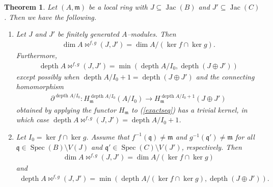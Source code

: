 \documentclass[10pt,a4paper]{amsart}
\newtheorem{theorem}{Theorem}
\DeclareMathOperator{\depth}{depth}
\DeclareMathOperator{\jac}{Jac}
\DeclareMathOperator{\spec}{Spec}
\begin{document}
\begin{theorem}\label{dimdepthcalclemma}
    Let $(A,\mathfrak{m})$ be a local ring with $J\subseteq \jac(B)$ and $J'\subseteq \jac(C)$. Then we have the following.
    \begin{enumerate}
        \item Let $J$ and $J'$ be finitely generated $A$--modules. Then 
        \begin{align*}
            \dim A\bowtie^{f,g}(J,J')=\dim A/(\ker f\cap \ker g).
        \end{align*}
        Furthermore,
        \begin{align*}
            \depth A\bowtie^{f,g}(J,J')=\min(\depth A/I_0,\depth (J\oplus J'))
        \end{align*}
        except possibly when $\depth A/I_0+1=\depth (J\oplus J')$ and the connecting homomorphism 
    \begin{align*}
        \partial^{\depth A/I_0}:H_{\mathfrak{m}}^{\depth A/I_0}(A/I_0)\to H_{\mathfrak{m}}^{\depth A/I_0+1}(J\oplus J')
    \end{align*}
    obtained by applying the functor $H_{\mathfrak{m}}$ to (\ref{exactseq}) has a trivial kernel, in which case $\depth A\bowtie^{f,g}(J,J')=\depth A/I_0+1$.
        \item Let $I_0= \ker f\cap\ker g$. Assume that $f^{-1}(\mathfrak{q}) \neq \mathfrak{m}$ and $g^{-1}(\mathfrak{q}') \neq \mathfrak{m}$ for all $\mathfrak{q}\in \spec (B)\setminus V(J)$ and $\mathfrak{q}'\in\spec (C)\setminus V(J')$, respectively. Then 
        \begin{align*}
            \dim A\bowtie^{f,g}(J,J')= \dim A/(\ker f\cap \ker g)
        \end{align*}
        and
        \begin{align*}
            \depth A\bowtie^{f,g}(J,J')=\min( \depth A/(\ker f\cap \ker g),\depth (J\oplus J')).
        \end{align*}
    \end{enumerate}
\end{theorem}
\end{document}
